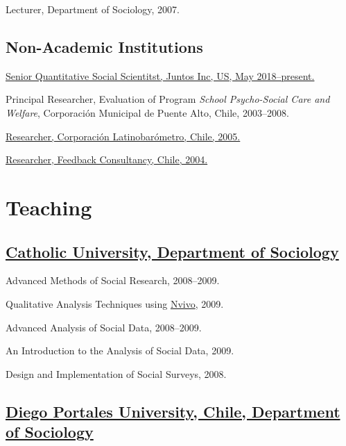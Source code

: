\documentclass[10pt,letterpaper]{article}
\renewenvironment{itemize}{
  \begin{list}{}{
    \setlength{\leftmargin}{1.5em}
    \setlength{\itemsep}{0.25em}
    \setlength{\parskip}{0pt}
    \setlength{\parsep}{0.25em}
  }
}{
  \end{list}
}
\begin{document}
\begin{itemize}
\item Lecturer, Department of Sociology, 2007.
\end{itemize}

\subsection*{Non-Academic Institutions}

\begin{itemize}
\item \href{http://juntosglobal.com/}{Senior Quantitative Social Scientitst, Juntos Inc, US, May 2018--present.}
\item Principal Researcher, Evaluation of Program \textit{School Psycho-Social Care and Welfare}, Corporación Municipal de Puente Alto, Chile, 2003--2008.
\item \href{http://www.latinobarometro.org}{Researcher, Corporación Latinobarómetro, Chile, 2005.}
\item \href{http://www.feedback.cl}{Researcher, Feedback Consultancy, Chile, 2004.}
\end{itemize}


\section*{Teaching}

\subsection*{\href{http://sociologia.uc.cl/}{Catholic University, Department of Sociology}}

\begin{itemize}
\item Advanced Methods of Social Research, 2008--2009.
\item Qualitative Analysis Techniques using \href{http://www.qsrinternational.com/}{Nvivo}, 2009.
\item Advanced Analysis of Social Data, 2008--2009.
\item An Introduction to the Analysis of Social Data, 2009.
\item Design and Implementation of Social Surveys, 2008.
\end{itemize}

\subsection*{\href{http://www.udp.cl/facultades_carreras/ciencias_sociales-historia/}{Diego Portales University, Chile, Department of Sociology}}
\end{document}
